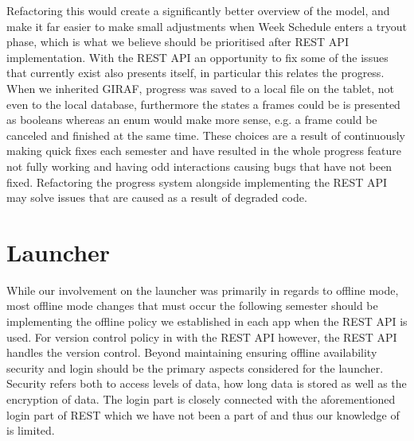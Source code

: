 Refactoring this would create a significantly better overview of the model, and make it far easier to make small adjustments when Week Schedule enters a tryout phase, which is what we believe should be prioritised after REST API implementation.
With the REST API an opportunity to fix some of the issues that currently exist also presents itself, in particular this relates the progress.
When we inherited GIRAF, progress was saved to a local file on the tablet, not even to the local database, furthermore the states a frames could be is presented as booleans whereas an enum would make more sense, e.g. a frame could be canceled and finished at the same time.
These choices are a result of continuously making quick fixes each semester and have resulted in the whole progress feature not fully working and having odd interactions causing bugs that have not been fixed.
Refactoring the progress system alongside implementing the REST API may solve issues that are caused as a result of degraded code.

\section{Launcher}
While our involvement on the launcher was primarily in regards to offline mode, most offline mode changes that must occur the following semester should be implementing the offline policy we established in each app when the REST API is used.
For version control policy in with the REST API however, the REST API handles the version control.
Beyond maintaining ensuring offline availability security and login should be the primary aspects considered for the launcher.
Security refers both to access levels of data, how long data is stored as well as the encryption of data.
The login part is closely connected with the aforementioned login part of REST which we have not been a part of and thus our knowledge of is limited.

